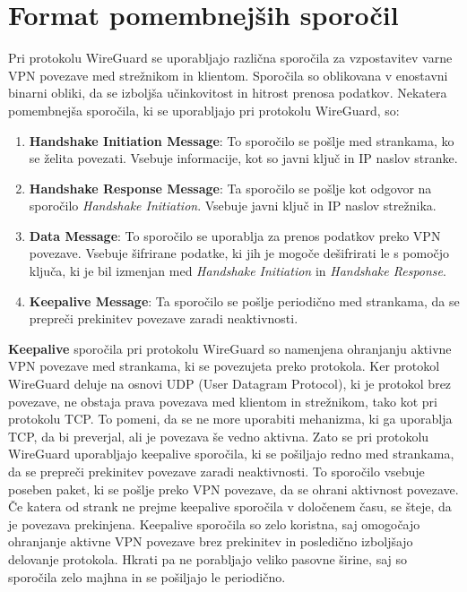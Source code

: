 \documentclass[a4paper, 11pt]{article}
\begin{document}
\section{Format pomembnejših sporočil}
Pri protokolu WireGuard se uporabljajo različna sporočila za vzpostavitev varne VPN povezave med strežnikom in klientom. 
Sporočila so oblikovana v enostavni binarni obliki, da se izboljša učinkovitost in hitrost prenosa podatkov.
Nekatera pomembnejša sporočila, ki se uporabljajo pri protokolu WireGuard, so:

\begin{enumerate}
    \item \textbf{Handshake Initiation Message}:  To sporočilo se pošlje med strankama, ko se želita povezati. Vsebuje informacije, kot so javni ključ in IP naslov stranke.
    \item \textbf{Handshake Response Message}: Ta sporočilo se pošlje kot odgovor na sporočilo \textit{Handshake Initiation}. Vsebuje javni ključ in IP naslov strežnika.
    \item \textbf{Data Message}: To sporočilo se uporablja za prenos podatkov preko VPN povezave. Vsebuje šifrirane podatke, ki jih je mogoče dešifrirati le s pomočjo ključa, 
        ki je bil izmenjan med \textit{Handshake Initiation} in \textit{Handshake Response}.
    \item \textbf{Keepalive Message}: Ta sporočilo se pošlje periodično med strankama, da se prepreči prekinitev povezave zaradi neaktivnosti.
\end{enumerate}

\textbf{Keepalive} sporočila pri protokolu WireGuard so namenjena ohranjanju aktivne VPN povezave med strankama, ki se povezujeta preko protokola.
Ker protokol WireGuard deluje na osnovi UDP (User Datagram Protocol), ki je protokol brez povezave, ne obstaja prava povezava med klientom in strežnikom, tako kot pri protokolu TCP. To pomeni, da se ne more uporabiti mehanizma, ki ga uporablja TCP, da bi preverjal, ali je povezava še vedno aktivna.
Zato se pri protokolu WireGuard uporabljajo keepalive sporočila, ki se pošiljajo redno med strankama, da se prepreči prekinitev povezave zaradi neaktivnosti. To sporočilo vsebuje poseben paket, ki se pošlje preko VPN povezave, da se ohrani aktivnost povezave. Če katera od strank ne prejme keepalive sporočila v določenem času, se šteje, da je povezava prekinjena.
Keepalive sporočila so zelo koristna, saj omogočajo ohranjanje aktivne VPN povezave brez prekinitev in posledično izboljšajo delovanje protokola. Hkrati pa ne porabljajo veliko pasovne širine, saj so sporočila zelo majhna in se pošiljajo le periodično.
\pagebreak
\end{document}
